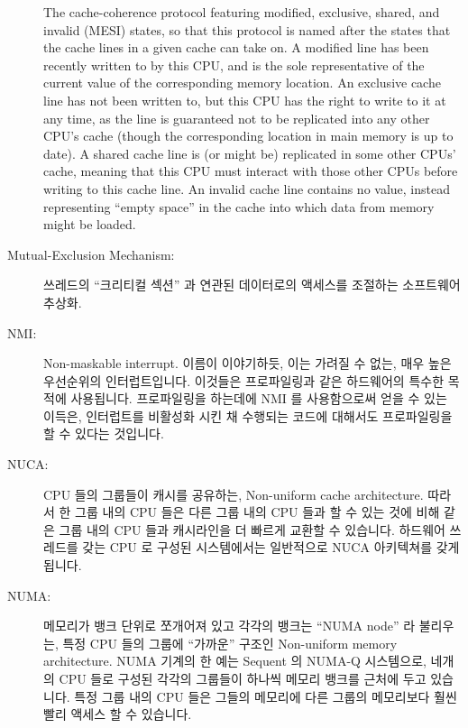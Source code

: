\begin{description}
	The
	cache-coherence protocol featuring
	modified, exclusive, shared, and invalid (MESI) states,
	so that this protocol is named after the states that the
	cache lines in a given cache can take on.
	A modified line has been recently written to by this CPU,
	and is the sole representative of the current value of
	the corresponding memory location.
	An exclusive cache line has not been written to, but this
	CPU has the right to write to it at any time, as the line
	is guaranteed not to be replicated into any other CPU's cache
	(though the corresponding location in main memory is up to date).
	A shared cache line is (or might be) replicated in some other
	CPUs' cache, meaning that this CPU must interact with those other
	CPUs before writing to this cache line.
	An invalid cache line contains no value, instead representing
	``empty space'' in the cache into which data from memory might
	be loaded.
	\fi
\item[Mutual-Exclusion Mechanism:]
	쓰레드의 ``크리티컬 섹션'' 과 연관된 데이터로의 액세스를 조절하는
	소프트웨어 추상화.
	\iffalse

	A software abstraction that regulates threads' access to
	``critical sections'' and corresponding data.
	\fi
\item[NMI:]
	Non-maskable interrupt.
	이름이 이야기하듯, 이는 가려질 수 없는, 매우 높은 우선순위의
	인터럽트입니다.
	이것들은 프로파일링과 같은 하드웨어의 특수한 목적에 사용됩니다.
	프로파일링을 하는데에 NMI 를 사용함으로써 얻을 수 있는 이득은,
	인터럽트를 비활성화 시킨 채 수행되는 코드에 대해서도 프로파일링을 할 수
	있다는 것입니다.
	\iffalse

	Non-maskable interrupt.
	As the name indicates, this is an extremely high-priority
	interrupt that cannot be masked.
	These are used for hardware-specific purposes such as profiling.
	The advantage of using NMIs for profiling is that it allows you
	to profile code that runs with interrupts disabled.
	\fi
\item[NUCA:]
	CPU 들의 그룹들이 캐시를 공유하는, Non-uniform cache architecture.
	따라서 한 그룹 내의 CPU 들은 다른 그룹 내의 CPU 들과 할 수 있는 것에
	비해 같은 그룹 내의 CPU 들과 캐시라인을 더 빠르게 교환할 수 있습니다.
	하드웨어 쓰레드를 갖는 CPU 로 구성된 시스템에서는 일반적으로 NUCA
	아키텍쳐를 갖게 됩니다.
	\iffalse

	Non-uniform cache architecture, where groups of CPUs share
	caches.
	CPUs in a group can therefore exchange cache lines with each
	other much more quickly than they can with CPUs in other groups.
	Systems comprised of CPUs with hardware threads will generally
	have a NUCA architecture.
	\fi
\item[NUMA:]
	메모리가 뱅크 단위로 쪼개어져 있고 각각의 뱅크는 ``NUMA node'' 라
	불리우는, 특정 CPU 들의 그룹에 ``가까운'' 구조인 Non-uniform memory
	architecture.
	NUMA 기계의 한 예는 Sequent 의 NUMA-Q 시스템으로, 네개의 CPU 들로
	구성된 각각의 그룹들이 하나씩 메모리 뱅크를 근처에 두고 있습니다.
	특정 그룹 내의 CPU 들은 그들의 메모리에 다른 그룹의 메모리보다 훨씬
	빨리 액세스 할 수 있습니다.
	\iffalse


\end{description}
